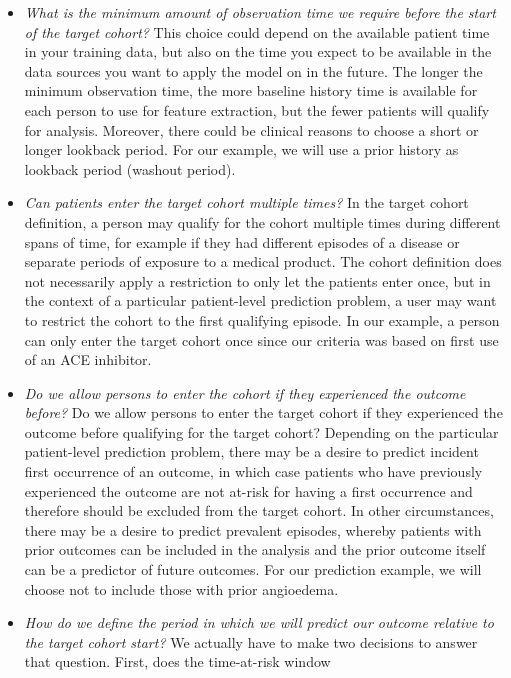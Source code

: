 \documentclass[11pt]{book}
\begin{document}
\begin{itemize}
\item
  \emph{What is the minimum amount of observation time we require before
  the start of the target cohort?} This choice could depend on the
  available patient time in your training data, but also on the time you
  expect to be available in the data sources you want to apply the model
  on in the future. The longer the minimum observation time, the more
  baseline history time is available for each person to use for feature
  extraction, but the fewer patients will qualify for analysis.
  Moreover, there could be clinical reasons to choose a short or longer
  lookback period. For our example, we will use a prior history as
  lookback period (washout period).
\item
  \emph{Can patients enter the target cohort multiple times?} In the
  target cohort definition, a person may qualify for the cohort multiple
  times during different spans of time, for example if they had
  different episodes of a disease or separate periods of exposure to a
  medical product. The cohort definition does not necessarily apply a
  restriction to only let the patients enter once, but in the context of
  a particular patient-level prediction problem, a user may want to
  restrict the cohort to the first qualifying episode. In our example, a
  person can only enter the target cohort once since our criteria was
  based on first use of an ACE inhibitor.
\item
  \emph{Do we allow persons to enter the cohort if they experienced the
  outcome before?} Do we allow persons to enter the target cohort if
  they experienced the outcome before qualifying for the target cohort?
  Depending on the particular patient-level prediction problem, there
  may be a desire to predict incident first occurrence of an outcome, in
  which case patients who have previously experienced the outcome are
  not at-risk for having a first occurrence and therefore should be
  excluded from the target cohort. In other circumstances, there may be
  a desire to predict prevalent episodes, whereby patients with prior
  outcomes can be included in the analysis and the prior outcome itself
  can be a predictor of future outcomes. For our prediction example, we
  will choose not to include those with prior angioedema.
\item
  \emph{How do we define the period in which we will predict our outcome
  relative to the target cohort start?} We actually have to make two
  decisions to answer that question. First, does the time-at-risk window

\end{itemize}
\end{document}
